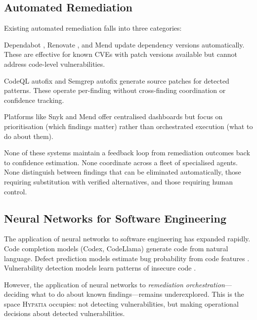 \documentclass[11pt,a4paper]{article}
\begin{document}
\subsection{Automated Remediation}

Existing automated remediation falls into three categories:

\begin{description}[nosep]
  \item[Dependency updaters:] Dependabot \citep{dependabot2017}, Renovate \citep{renovate2017}, and Mend update dependency versions automatically. These are effective for known CVEs with patch versions available but cannot address code-level vulnerabilities.
  \item[Autofix engines:] CodeQL autofix \citep{codeql-autofix2024} and Semgrep autofix generate source patches for detected patterns. These operate per-finding without cross-finding coordination or confidence tracking.
  \item[Security orchestrators:] Platforms like Snyk and Mend offer centralised dashboards but focus on prioritisation (which findings matter) rather than orchestrated execution (what to do about them).
\end{description}

\noindent None of these systems maintain a feedback loop from remediation outcomes back to confidence estimation. None coordinate across a fleet of specialised agents. None distinguish between findings that can be eliminated automatically, those requiring substitution with verified alternatives, and those requiring human control.

\subsection{Neural Networks for Software Engineering}

The application of neural networks to software engineering has expanded rapidly. Code completion models (Codex, CodeLlama) generate code from natural language. Defect prediction models estimate bug probability from code features \citep{wang2016}. Vulnerability detection models learn patterns of insecure code \citep{li2018}.

However, the application of neural networks to \emph{remediation orchestration}---deciding what to do about known findings---remains underexplored. This is the space \textsc{Hypatia} occupies: not detecting vulnerabilities, but making operational decisions about detected vulnerabilities.
\end{document}
